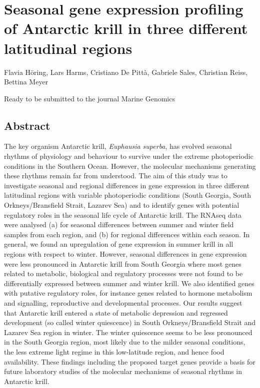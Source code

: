 \chapter[Publication I]{Seasonal gene expression profiling of Antarctic krill
in three different latitudinal regions}

Flavia Höring, Lars Harms, Cristiano De Pittà, Gabriele Sales, Christian Reiss,
Bettina Meyer

Ready to be submitted to the journal Marine Genomics

\section*{Abstract}
The key organism Antarctic krill, \textit{Euphausia superba}, has evolved
seasonal rhythms of physiology and behaviour to survive under the extreme
photoperiodic conditions in the Southern Ocean. However, the molecular
mechanisms generating these rhythms remain far from understood. The aim of this
study was to investigate seasonal and regional differences in gene expression
in three different latitudinal regions with variable photoperiodic conditions
(South Georgia, South Orkneys/Bransfield Strait, Lazarev Sea) and to identify
genes with potential regulatory roles in the seasonal life cycle of Antarctic
krill. The RNAseq data were analysed (a) for seasonal differences
between summer and winter field samples from each region, and (b) for
regional differences within each season. In general, we found an upregulation
of gene expression in summer krill in all regions with respect to winter.
However, seasonal differences in gene expression were less pronounced in
Antarctic krill from South Georgia where most genes related to metabolic,
biological and regulatory processes were not found to be differentially
expressed between summer and winter krill. We also identified genes with
putative regulatory roles, for instance genes related to hormone metabolism and
signalling, reproductive and developmental processes. Our results suggest that
Antarctic krill entered a state of metabolic depression and regressed
development (so called winter quiescence) in South Orkneys/Bransfield Strait
and Lazarev Sea region in winter. The winter quiescence seems to be less
pronounced in the South Georgia region, most likely due to the milder seasonal
conditions, the less extreme light regime in this low-latitude region, and
hence food availability. These findings including the proposed target genes
provide a basis for future laboratory studies of the molecular mechanisms of
seasonal rhythms in Antarctic krill.

